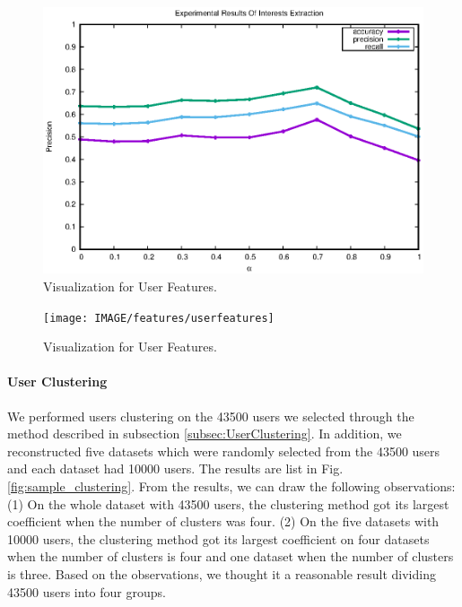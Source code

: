 \begin{figure}[!htb]
\centering
\includegraphics[width=.96\linewidth]{IMAGE/features/Interests}
\caption{Visualization for User Features.}
\label{fig:Interests}
\end{figure}

\begin{figure}[!htb]
\centering
\texttt{[image: IMAGE/features/userfeatures]}
\caption{Visualization for User Features.}
\label{fig:userFeatures}
\end{figure}

\paragraph{User Clustering}

We performed users clustering on the 43500 users we selected through the method described in subsection \ref{subsec:UserClustering}. In addition, we reconstructed five datasets which were randomly selected from the 43500 users and each dataset had 10000 users. The results are list in Fig. \ref{fig:sample_clustering}. From the results, we can draw the following observations:
(1) On the whole dataset with 43500 users, the clustering method got its largest coefficient when the number of clusters was four.
(2) On the five datasets with 10000 users, the clustering method got its largest coefficient on four datasets when the number of clusters is four and one dataset when the number of clusters is three. Based on the observations, we thought it a reasonable result dividing 43500 users into four groups.\par


